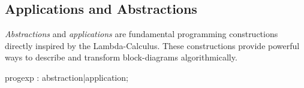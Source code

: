 %  









\subsection{Applications and Abstractions}

\textit{Abstractions} and \textit{applications} are fundamental programming constructions directly inspired by the Lambda-Calculus. These constructions provide powerful ways to describe and transform block-diagrams algorithmically.


\begin{rail}
progexp : abstraction|application;
\end{rail}   
 
